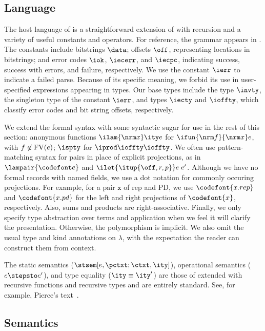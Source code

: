 \subsection{\Implang{} Language}
\label{sec:host-lang}
The host language of \ddc{} is a straightforward 
extension of \fomega{} with recursion and a variety of useful constants
and operators.  
For reference, the grammar appears in .
The constants include bitstrings $\data$; offsets $\off$, representing
locations in bitstrings; and error codes $\iok$, $\iecerr$, and
$\iecpc$, indicating success, success with errors, and failure,
respectively. We use the constant $\ierr$ to indicate a failed parse.
Because of its specific meaning, we forbid its use in user-specified
expressions appearing in \ddc{} types.
Our base types include the type $\invty$, the singleton type of the
constant $\ierr$, and types $\iecty$ and $\ioffty$, which classify
error codes and bit string offsets, respectively.

We extend the formal syntax with some syntactic sugar for use in the
rest of this section: anonymous functions $\ilam {\nrm x} \ity e$ for
$\ifun {\nrm f} {\nrm x} e$, with $f \not\in {\rm FV}(e)$; $\ispty$
for $\iprod \ioffty \ioffty$.  We often use pattern-matching syntax
for pairs in place of explicit projections, as in $\lampair{\codefont
  e}$ and $\ilet {\itup{\off,r,p}} e\; e'$.  Although we have no
formal records with named fields, we use a dot notation for commonly
occuring projections. For example, for a pair $\mathtt x$ of rep and
PD, we use $\codefont{x.rep}$ and $\codefont{x.pd}$ for the left and
right projections of $\codefont{x}$, respectively. Also, sums and
products are right-associative.  Finally, we only specify type
abstraction over terms and application when we feel it will clarify
the presentation. Otherwise, the polymorphism is implicit.  We also
omit the usual type and kind annotations on $\lambda$, with the
expectation the reader can construct them from context.  

The static semantics ($\stsem[e,{\pctxt;\ctxt},\ity]$), operational
semantics ($e \stepsto e'$), and type 
equality ($\ity \equiv \ity'$) are those of \fomega{} extended with
recursive functions and recursive types and are entirely standard.
See, for example, Pierce's text~\cite{pierce:tapl}.

\subsection{\ddc{} Semantics}
\label{sec:ddc-sem}

